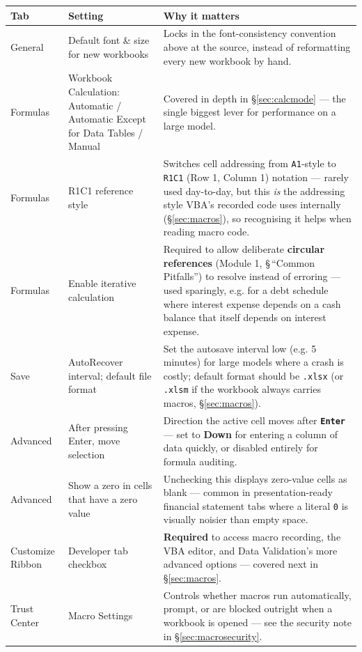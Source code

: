\documentclass[11pt,a4paper]{article}
\newcommand{\key}[1]{\texttt{\colorbox{black!8}{\textbf{#1}}}}
\begin{document}
\begin{center}
\begin{tabular}{@{}L{2.6cm}L{3.2cm}L{6.0cm}@{}}
\toprule
\textbf{Tab} & \textbf{Setting} & \textbf{Why it matters} \\
\midrule
General & Default font \& size for new workbooks & Locks in the font-consistency convention above at the source, instead of reformatting every new workbook by hand. \\
Formulas & Workbook Calculation: Automatic / Automatic Except for Data Tables / Manual & Covered in depth in \S\ref{sec:calcmode} --- the single biggest lever for performance on a large model. \\
Formulas & R1C1 reference style & Switches cell addressing from \texttt{A1}-style to \texttt{R1C1} (Row 1, Column 1) notation --- rarely used day-to-day, but this \emph{is} the addressing style VBA's recorded code uses internally (\S\ref{sec:macros}), so recognising it helps when reading macro code. \\
Formulas & Enable iterative calculation & Required to allow deliberate \textbf{circular references} (Module 1, \S\,``Common Pitfalls'') to resolve instead of erroring --- used sparingly, e.g. for a debt schedule where interest expense depends on a cash balance that itself depends on interest expense. \\
Save & AutoRecover interval; default file format & Set the autosave interval low (e.g. 5 minutes) for large models where a crash is costly; default format should be \texttt{.xlsx} (or \texttt{.xlsm} if the workbook always carries macros, \S\ref{sec:macros}). \\
Advanced & After pressing Enter, move selection & Direction the active cell moves after \key{Enter} --- set to \textbf{Down} for entering a column of data quickly, or disabled entirely for formula auditing. \\
Advanced & Show a zero in cells that have a zero value & Unchecking this displays zero-value cells as blank --- common in presentation-ready financial statement tabs where a literal \texttt{0} is visually noisier than empty space. \\
Customize Ribbon & Developer tab checkbox & \textbf{Required} to access macro recording, the VBA editor, and Data Validation's more advanced options --- covered next in \S\ref{sec:macros}. \\
Trust Center & Macro Settings & Controls whether macros run automatically, prompt, or are blocked outright when a workbook is opened --- see the security note in \S\ref{sec:macrosecurity}. \\
\bottomrule
\end{tabular}
\end{center}
\end{document}
